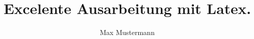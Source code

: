 \documentclass[11pt,a4paper,headsepline,footsepline]{scrartcl}
\begin{document}
\author{Max Mustermann}
\title{Excelente Ausarbeitung mit Latex.}
\maketitle 

\newpage
\tableofcontents

\newpage
\listoffigures %

\newpage
\listoftables %


\newpage
{}


\newpage


\end{document}
